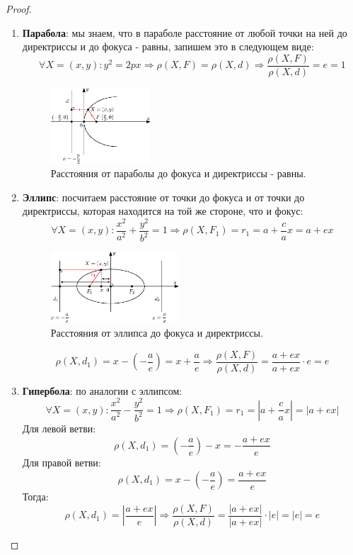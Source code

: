 \documentclass[12pt]{article}
\theoremstyle{definition}
\begin{document}
\begin{proof}\hfill
	\begin{enumerate}[label=\arabic*)]
		\item \textbf{Парабола}: мы знаем, что в параболе расстояние от любой точки на ней до директриссы и до фокуса - равны, запишем это в следующем виде:
		$$
			\forall X = (x,y) \colon y^2 = 2px \Rightarrow \rho(X,F) = \rho(X,d) \Rightarrow \dfrac{\rho(X,F)}{\rho(X,d)} = e = 1
		$$
		\begin{figure}[H]
			\centering
			\includegraphics[width=0.35\textwidth]{ANGL3_10.eps}
			\caption{Расстояния от параболы до фокуса и директриссы - равны.}
			\label{3_10}
		\end{figure}
		\item \textbf{Эллипс}: посчитаем расстояние от точки до фокуса и от точки до директриссы, которая находится на той же стороне, что и фокус:
		$$
			\forall X = (x,y) \colon \dfrac{x^2}{a^2} + \dfrac{y^2}{b^2} = 1 \Rightarrow \rho(X,F_1) = r_1 = a + \dfrac{c}{a}x = a + ex
		$$
		\begin{figure}[H]
			\centering
			\includegraphics[width=0.45\textwidth]{ANGL3_11.eps}
			\caption{Расстояния от эллипса до фокуса и директриссы.}
			\label{3_11}
		\end{figure}
		$$
			\rho(X,d_1) = x - \left(-\dfrac{a}{e}\right) = x + \dfrac{a}{e} \Rightarrow \dfrac{\rho(X,F)}{\rho(X,d)} = \dfrac{a + ex}{a + ex}{\cdot}e = e
		$$
		\item \textbf{Гипербола}: по аналогии с эллипсом:
		$$
			\forall X = (x,y)\colon \dfrac{x^2}{a^2} - \dfrac{y^2}{b^2} = 1 \Rightarrow \rho(X,F_1) = r_1 = \left| a + \dfrac{c}{a}x\right|  = |a + ex|
		$$
		Для левой ветви:
		$$
			\rho(X,d_1) = \left(-\dfrac{a}{e}\right) - x = -\dfrac{a + ex}{e}
		$$
		Для правой ветви:
		$$
			\rho(X,d_1) = x - \left(-\dfrac{a}{e}\right) = \dfrac{a + ex}{e}
		$$
		Тогда:
		$$
			\rho(X,d_1) = \left|\dfrac{a + ex}{e} \right| \Rightarrow \dfrac{\rho(X,F)}{\rho(X,d)} = \dfrac{|a + ex|}{|a + ex|}{\cdot}|e| = |e| = e
		$$
	\end{enumerate}
\end{proof}
\end{document}
